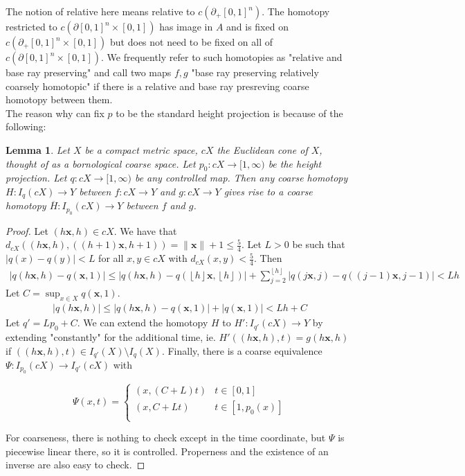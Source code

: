 \documentclass[a4paper,11pt]{article}
\theoremstyle{definition}
\theoremstyle{plain}
\newtheorem{lemma}[definition]{Lemma}
\theoremstyle{remark}
\begin{document}
The notion of relative here means relative to $c(\partial_{+}[0,1]^n)$. The homotopy restricted to $c(\partial [0,1]^n \times [0,1])$ has image in $A$ and is fixed on $c(\partial_{+}[0,1]^n \times [0,1])$ but does not need to be fixed on all of $c(\partial [0,1]^n \times [0,1])$. We frequently refer to such homotopies as "relative and base ray preserving" and call two maps $f,g$ "base ray preserving relatively coarsely homotopic" if there is a relative and base ray presreving coarse homotopy between them. \\

The reason why can fix $p$ to be the standard height projection is because of the following:


\begin{lemma} \label{p_0} Let $X$ be a compact metric space, $cX$ the Euclidean cone of $X$, thought of as a bornological coarse space. Let $p_0:cX\rightarrow [1,\infty)$ be the height projection. Let $q: cX\rightarrow [1,\infty)$ be any controlled map. Then any coarse homotopy $H:I_{q}(cX)\rightarrow Y$ between $f:cX\rightarrow Y$ and $g: cX\rightarrow Y$ gives rise to a coarse homotopy $\overline{H}: I_{p_0}(cX)\rightarrow Y$ between $f$ and $g$. 
\end{lemma}
\begin{proof} Let $(h\mathbf{x},h)\in cX$. We have that $d_{cX}((h\mathbf{x},h),((h+1)\mathbf{x},h+1)) = \|\mathbf{x}\|+1\leq \frac{5}{4}$. Let $L>0$ be such that $|q(x)-q(y)|<L$ for all $x,y\in cX$ with $d_{cX}(x,y)<\frac{5}{4}$. Then
\begin{align*}
|q(h\mathbf{x},h)-q(\mathbf{x},1)| \leq |q(h\mathbf{x},h)-q(\left \lfloor{h}\right\rfloor\mathbf{x}, \left \lfloor{h}\right\rfloor )| + \sum_{j=2}^{\left \lfloor{h}\right \rfloor } |q(j\mathbf{x},j)-q((j-1)\mathbf{x},j-1)|<Lh 
\end{align*}
Let $C = \sup_{x\in X} q(\mathbf{x},1)$. 
\begin{align*}
|q(h\mathbf{x},h)| \leq |q(h\mathbf{x},h)-q(\mathbf{x},1)| + |q(\mathbf{x},1)| < Lh + C
\end{align*}
Let $q' = L p_0 + C$. We can extend the homotopy $H$ to $H': I_{q'}(cX)\rightarrow Y$ by extending "constantly" for the additional time, ie. $H'((h\mathbf{x},h),t) = g(h\mathbf{x},h)$ if $((h\mathbf{x},h),t) \in I_{q'}(X)\setminus I_{q}(X)$. Finally, there is a coarse equivalence $\Psi: I_{p_0}(cX)\rightarrow I_{q'}(cX)$ with 

\[ \Psi(x,t) = \begin{cases} 
          (x,(C+L)t) & t\in [0,1] \\
          (x,C+Lt)& t\in [1,p_{0}(x)] \\ 
       \end{cases}
    \]
    
    
For coarseness, there is nothing to check except in the time coordinate, but $\Psi$ is piecewise linear there, so it is controlled. Properness and the existence of an inverse are also easy to check.
\end{proof} 
\end{document}
